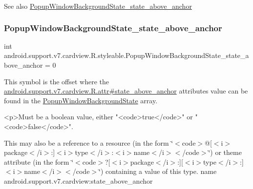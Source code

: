 \begin{DoxySeeAlso}{See also}
\hyperlink{classandroid_1_1support_1_1v7_1_1cardview_1_1R_1_1styleable_ad3945523bf49bb5463a2804bc26c1f48}{Popup\+Window\+Background\+State\+\_\+state\+\_\+above\+\_\+anchor} 
\end{DoxySeeAlso}
\mbox{\label{classandroid_1_1support_1_1v7_1_1cardview_1_1R_1_1styleable_ad3945523bf49bb5463a2804bc26c1f48}} 
\subsubsection{\texorpdfstring{Popup\+Window\+Background\+State\+\_\+state\+\_\+above\+\_\+anchor}{PopupWindowBackgroundState\_state\_above\_anchor}}
{\footnotesize\ttfamily int android.\+support.\+v7.\+cardview.\+R.\+styleable.\+Popup\+Window\+Background\+State\+\_\+state\+\_\+above\+\_\+anchor = 0\hspace{0.3cm}{\ttfamily [static]}}

This symbol is the offset where the \hyperlink{classandroid_1_1support_1_1v7_1_1cardview_1_1R_1_1attr_adea8ad1314d74568d3e4a64ff7a64192}{android.\+support.\+v7.\+cardview.\+R.\+attr\#state\+\_\+above\+\_\+anchor} attribute\textquotesingle{}s value can be found in the \hyperlink{classandroid_1_1support_1_1v7_1_1cardview_1_1R_1_1styleable_aa90cb6768345b77eef33904f63e11b51}{Popup\+Window\+Background\+State} array.

\begin{DoxyVerb}      <p>Must be a boolean value, either "<code>true</code>" or "<code>false</code>".
\end{DoxyVerb}
 

This may also be a reference to a resource (in the form \char`\"{}$<$code$>$@\mbox{[}$<$i$>$package$<$/i$>$\+:\mbox{]}$<$i$>$type$<$/i$>$\+:$<$i$>$name$<$/i$>$$<$/code$>$\char`\"{}) or theme attribute (in the form \char`\"{}$<$code$>$?\mbox{[}$<$i$>$package$<$/i$>$\+:\mbox{]}\mbox{[}$<$i$>$type$<$/i$>$\+:\mbox{]}$<$i$>$name$<$/i$>$$<$/code$>$\char`\"{}) containing a value of this type.  name android.\+support.\+v7.\+cardview\+:state\+\_\+above\+\_\+anchor \mbox{\label{classandroid_1_1support_1_1v7_1_1cardview_1_1R_1_1styleable_a65f321ce206d51d7c6ea76d7ea7bbb05}} 

